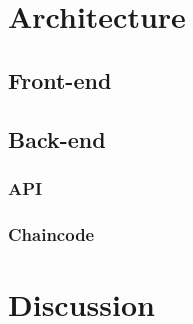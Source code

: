 \documentclass[11pt]{article}
\begin{document}
\begin{multicols}{2}
        \section{Architecture}
            \subsection{Front-end}
            \subsection{Back-end}
                \subsubsection{API}
                \subsubsection{Chaincode}
        \section{Discussion}
    \end{multicols}
\end{document}

